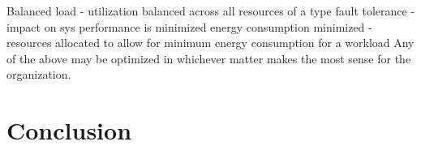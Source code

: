 \documentclass[fullapage,12pt]{article}
\begin{document}

\cite{Jennings2015}
Balanced load - utilization balanced across all resources of a type
fault tolerance - impact on sys performance is minimized
energy consumption minimized - resources allocated to allow for minimum energy consumption for a workload
Any of the above may be optimized in whichever matter makes the most sense for the organization.


\section{Conclusion}





\end{document}
